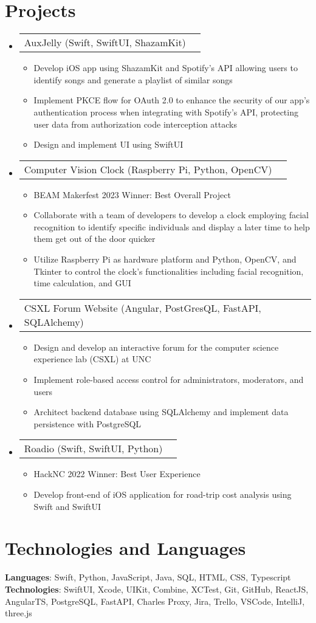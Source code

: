 \documentclass[letterpaper,11pt]{article}
\makeatletter
\newcommand{\resumeItem}[1]{
  \item\small{
    {#1 \vspace{-2pt}}
  }
}
\newcommand{\resumeProjectHeading}[2]{
    \item
    \begin{tabular*}{0.97\textwidth}{l@{\extracolsep{\fill}}r}
      \small#1 & #2 \\
    \end{tabular*}\vspace{-7pt}
}
\newcommand{\resumeSubHeadingListStart}{\begin{itemize}[leftmargin=0.15in, label={}]}
\newcommand{\resumeSubHeadingListEnd}{\end{itemize}}
\newcommand{\resumeItemListStart}{\begin{itemize}}
\newcommand{\resumeItemListEnd}{\end{itemize}\vspace{-5pt}}
\makeatother
\begin{document}
\section{Projects}
  \resumeSubHeadingListStart
    \resumeProjectHeading{AuxJelly (Swift, SwiftUI, ShazamKit)}{}
      \resumeItemListStart
        \resumeItem{Develop iOS app using ShazamKit and Spotify's API allowing users to identify songs and generate a playlist of similar songs}
        \resumeItem{Implement PKCE flow for OAuth 2.0 to enhance the security of our app's authentication process when integrating with Spotify's API, protecting user data from authorization code interception attacks}
        \resumeItem{Design and implement UI using SwiftUI}
      \resumeItemListEnd
    \resumeProjectHeading{Computer Vision Clock (Raspberry Pi, Python, OpenCV)}{}
      \resumeItemListStart
        \resumeItem{BEAM Makerfest 2023 Winner: Best Overall Project}
        \resumeItem{Collaborate with a team of developers to develop a clock employing facial recognition to identify specific individuals and display a later time to help them get out of the door quicker}
        \resumeItem{Utilize Raspberry Pi as hardware platform and Python, OpenCV, and Tkinter to control the clock's functionalities including facial recognition, time calculation, and GUI}
      \resumeItemListEnd
    \resumeProjectHeading{CSXL Forum Website (Angular, PostGresQL, FastAPI, SQLAlchemy)}{}
      \resumeItemListStart
        \resumeItem{Design and develop an interactive forum for the computer science experience lab (CSXL) at UNC}
        \resumeItem{Implement role-based access control for administrators, moderators, and users}
        \resumeItem{Architect backend database using SQLAlchemy and implement data persistence with PostgreSQL}
      \resumeItemListEnd
    \resumeProjectHeading{Roadio (Swift, SwiftUI, Python)}{}
      \resumeItemListStart
        \resumeItem{HackNC 2022 Winner: Best User Experience}
        \resumeItem{Develop front-end of iOS application for road-trip cost analysis using Swift and SwiftUI}
      \resumeItemListEnd
  \resumeSubHeadingListEnd

\section{Technologies and Languages}
  \begin{itemize}[leftmargin=0.15in, label={}]
    \small{\item{
      \textbf{Languages}{: Swift, Python, JavaScript, Java, SQL, HTML, CSS, Typescript} \\
      \textbf{Technologies}{: SwiftUI, Xcode, UIKit, Combine, XCTest, Git, GitHub, ReactJS, AngularTS, PostgreSQL, FastAPI, Charles Proxy, Jira, Trello, VSCode, IntelliJ, three.js}
    }}
  \end{itemize}

\end{document}
